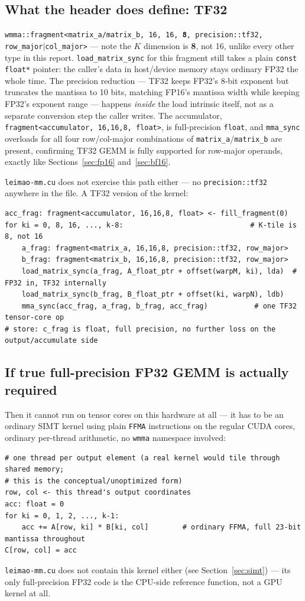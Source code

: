 \documentclass[11pt]{article}
\begin{document}
\subsection{What the header does define: TF32}
\texttt{wmma::fragment<matrix\_a/matrix\_b, 16, 16, \textbf{8}, precision::tf32,
row\_major$|$col\_major>} --- note the $K$ dimension is \textbf{8}, not 16, unlike every
other type in this report. \texttt{load\_matrix\_sync} for this fragment still takes a
plain \texttt{const float*} pointer: the caller's data in host/device memory stays
ordinary FP32 the whole time. The precision reduction --- TF32 keeps FP32's 8-bit
exponent but truncates the mantissa to 10 bits, matching FP16's mantissa width while
keeping FP32's exponent range --- happens \emph{inside} the load intrinsic itself, not as
a separate conversion step the caller writes. The accumulator,
\texttt{fragment<accumulator, 16,16,8, float>}, is full-precision \texttt{float}, and
\texttt{mma\_sync} overloads for all four row/col-major combinations of
\texttt{matrix\_a}/\texttt{matrix\_b} are present, confirming TF32 GEMM is fully
supported for row-major operands, exactly like Sections~\ref{sec:fp16}
and~\ref{sec:bf16}.

\texttt{leimao-mm.cu} does not exercise this path either --- no \texttt{precision::tf32}
anywhere in the file. A TF32 version of the kernel:
\begin{lstlisting}
acc_frag: fragment<accumulator, 16,16,8, float> <- fill_fragment(0)
for ki = 0, 8, 16, ..., k-8:                              # K-tile is 8, not 16
    a_frag: fragment<matrix_a, 16,16,8, precision::tf32, row_major>
    b_frag: fragment<matrix_b, 16,16,8, precision::tf32, row_major>
    load_matrix_sync(a_frag, A_float_ptr + offset(warpM, ki), lda)  # FP32 in, TF32 internally
    load_matrix_sync(b_frag, B_float_ptr + offset(ki, warpN), ldb)
    mma_sync(acc_frag, a_frag, b_frag, acc_frag)           # one TF32 tensor-core op
# store: c_frag is float, full precision, no further loss on the output/accumulate side
\end{lstlisting}

\subsection{If true full-precision FP32 GEMM is actually required}
Then it cannot run on tensor cores on this hardware at all --- it has to be an ordinary
SIMT kernel using plain \texttt{FFMA} instructions on the regular CUDA cores, ordinary
per-thread arithmetic, no \texttt{wmma} namespace involved:
\begin{lstlisting}
# one thread per output element (a real kernel would tile through shared memory;
# this is the conceptual/unoptimized form)
row, col <- this thread's output coordinates
acc: float = 0
for ki = 0, 1, 2, ..., k-1:
    acc += A[row, ki] * B[ki, col]        # ordinary FFMA, full 23-bit mantissa throughout
C[row, col] = acc
\end{lstlisting}
\texttt{leimao-mm.cu} does not contain this kernel either (see Section~\ref{sec:simt}) ---
its only full-precision FP32 code is the CPU-side reference function, not a GPU kernel at
all.
\end{document}
